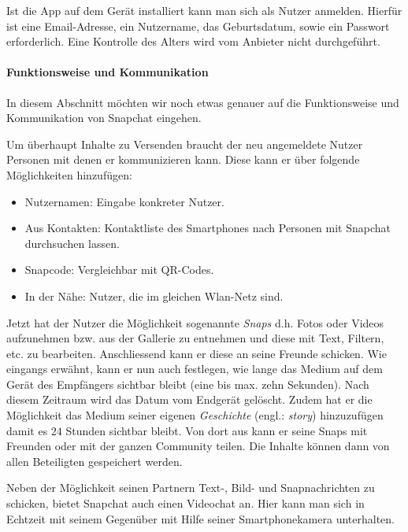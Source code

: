 Ist die App auf dem Ger\"at installiert kann man sich als Nutzer anmelden.
Hierf\"ur ist eine Email-Adresse, ein Nutzername, das Geburtsdatum, sowie ein
Passwort erforderlich. Eine Kontrolle des Alters wird vom Anbieter nicht
durchgef\"uhrt.

\paragraph{Funktionsweise und Kommunikation}
In diesem Abschnitt m\"ochten wir noch etwas genauer auf die Funktionsweise und
Kommunikation von Snapchat eingehen.

Um \"uberhaupt Inhalte zu Versenden braucht der neu angemeldete Nutzer Personen
mit denen er kommunizieren kann. Diese kann er \"uber folgende M\"oglichkeiten
hinzuf\"ugen:
\begin{itemize}
	\item Nutzernamen: Eingabe konkreter Nutzer.
	\item Aus Kontakten: Kontaktliste des Smartphones nach Personen mit
	Snapchat durchsuchen lassen.
	\item Snapcode: Vergleichbar mit QR-Codes.
	\item In der N\"ahe: Nutzer, die im gleichen Wlan-Netz sind.
\end{itemize}

Jetzt hat der Nutzer die M\"oglichkeit sogenannte \emph{Snaps} d.h. Fotos oder
Videos aufzunehmen bzw. aus der Gallerie zu entnehmen und diese mit Text,
Filtern, etc. zu bearbeiten. Anschliessend kann er diese an seine Freunde
schicken. Wie eingangs erw\"ahnt, kann er nun auch festlegen, wie lange das
Medium auf dem Ger\"at des Empf\"angers sichtbar bleibt (eine bis max. zehn
Sekunden). Nach diesem Zeitraum wird das Datum vom Endger\"at gel\"oscht. Zudem
hat er die M\"oglichkeit das Medium seiner eigenen \emph{Geschichte} (engl.:
\emph{story}) hinzuzuf\"ugen damit es $24$ Stunden sichtbar bleibt. Von dort
aus kann er seine Snaps mit Freunden oder mit der ganzen Community teilen. Die
Inhalte k\"onnen dann von allen Beteiligten gespeichert werden.

Neben der M\"oglichkeit seinen Partnern Text-, Bild- und Snapnachrichten zu
schicken, bietet Snapchat auch einen Videochat an. Hier kann man sich in
Echtzeit mit seinem Gegen\"uber mit Hilfe seiner Smartphonekamera unterhalten.

